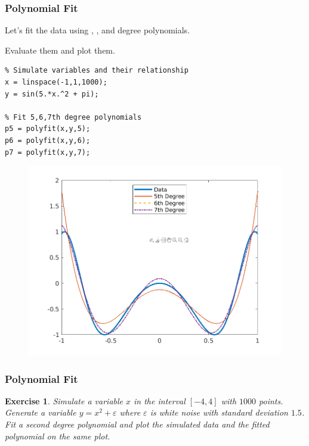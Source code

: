 \documentclass[11pt,xcolor={svgnames},aspectratio=169,usepdftitle=false]{beamer}
\let\toneitemize\itemize
\let\ttwoitemize\enditemize
\renewenvironment{itemize}{\toneitemize\addtolength{\itemsep}{0.7\baselineskip}}{\ttwoitemize}
\newtheorem{exercise}{Exercise}
\begin{document}
\begin{frame}[fragile]
  \frametitle{Polynomial Fit}
  \begin{itemize}
    \item Let's fit the data using , , and  degree polynomials.
    \item Evaluate them and plot them.
  \end{itemize}

\begin{minipage}{0.45\textwidth}
\begin{lstlisting}
% Simulate variables and their relationship
x = linspace(-1,1,1000);
y = sin(5.*x.^2 + pi);
  
% Fit 5,6,7th degree polynomials
p5 = polyfit(x,y,5);
p6 = polyfit(x,y,6);
p7 = polyfit(x,y,7);
\end{lstlisting}
\end{minipage}
\begin{minipage}{0.45\textwidth}
\begin{figure}
  \centering
    \includegraphics[width = \textwidth]{../figures/poly_fit.png}
\end{figure}
\end{minipage}
\end{frame}

\begin{frame}
    \frametitle{Polynomial Fit}
\begin{exercise}
Simulate a variable $x$ in the interval $[-4,4]$ with $1000$ points. Generate a variable $y = x^2 + \varepsilon$ where $\varepsilon$ is white noise with standard  deviation $1.5$. Fit a second degree polynomial and plot the simulated data and the fitted polynomial on the same plot.
\end{exercise}
\end{frame}
\end{document}
